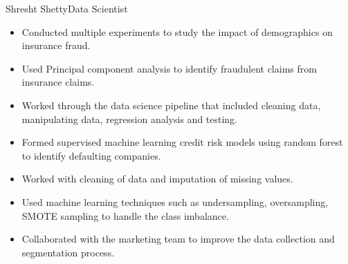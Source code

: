 \documentclass{article}
\begin{document}
\begin{cv}{Shresht Shetty}{Data Scientist}
\begin{cvevent}[Jan 2020][August 2021]
\begin{itemize}
        \item Conducted multiple experiments to study the impact of demographics on insurance fraud.

        \item Used Principal component analysis to identify fraudulent claims from insurance claims.

        \item Worked through the data science pipeline that included cleaning data, manipulating data, regression analysis and testing.

    \end{itemize}

\end{cvevent}



\cvseparator[2]

\begin{cvevent}[Jun 2019][April 2020]



    \begin{itemize}

        \item Formed supervised machine learning credit risk models using random forest to identify defaulting companies.

        \item Worked with cleaning of data and imputation of missing values.

        \item Used machine learning techniques such as undersampling, oversampling, SMOTE sampling to handle the class imbalance.

    \end{itemize}

\end{cvevent}



\cvseparator[2]

\begin{cvevent}[March 2019][June 2019]



    \begin{itemize}

        \item Collaborated with the marketing team to improve the data collection and segmentation process.


\end{itemize}
\end{cvevent}
\end{cv}
\end{document}
